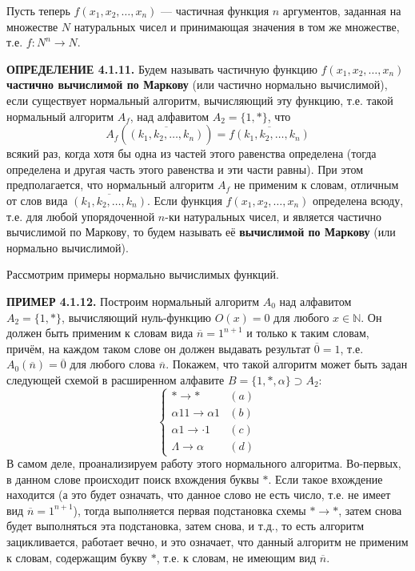 \documentclass[a4paper,12pt]{article}
\begin{document}
Пусть теперь \(f(x_1, x_2, \dots, x_n)\) --- частичная функция \(n\) аргументов, заданная на множестве \(N\) натуральных чисел и принимающая значения в том же множестве, т.е. \(f: N^n \to N\).

\textbf{ОПРЕДЕЛЕНИЕ 4.1.11.} Будем называть частичную функцию \(f(x_1, x_2, \dots, x_n)\) \textbf{частично вычислимой по Маркову} (или частично нормально вычислимой), если существует нормальный алгоритм, вычисляющий эту функцию, т.е. такой нормальный алгоритм \(A_f\), над алфавитом \(A_2 = \{1, *\}\), что
\[
A_f(\overline{(k_1, k_2, \dots, k_n)}) = \overline{f(k_1, k_2, \dots, k_n)}
\]
всякий раз, когда хотя бы одна из частей этого равенства определена (тогда определена и другая часть этого равенства и эти части равны). При этом предполагается, что нормальный алгоритм \(A_f\) не применим к словам, отличным от слов вида \(\overline{(k_1, k_2, \dots, k_n)}\). Если функция \(f(x_1, x_2, \dots, x_n)\) определена всюду, т.е. для любой упорядоченной \(n\)-ки натуральных чисел, и является частично вычислимой по Маркову, то будем называть её \textbf{вычислимой по Маркову} (или нормально вычислимой).

Рассмотрим примеры нормально вычислимых функций.

\textbf{ПРИМЕР 4.1.12.} Построим нормальный алгоритм \(A_0\) над алфавитом \(A_2 = \{1, *\}\), вычисляющий нуль-функцию \(O(x) = 0\) для любого \(x \in \mathbb{N}\). Он должен быть применим к словам вида \(\overline{n} = 1^{n+1}\) и только к таким словам, причём, на каждом таком слове он должен выдавать результат \(\overline{0} = 1\), т.е. \(A_0(\overline{n}) = \overline{0}\) для любого слова \(\overline{n}\). Покажем, что такой алгоритм может быть задан следующей схемой в расширенном алфавите \(B = \{1, *, \alpha\} \supset A_2\):
\[
\begin{cases}
* \to * & (a) \\
\alpha 11 \to \alpha 1 & (b) \\
\alpha 1 \to \cdot 1 & (c) \\
\Lambda \to \alpha & (d)
\end{cases}
\]
В самом деле, проанализируем работу этого нормального алгоритма. Во-первых, в данном слове происходит поиск вхождения буквы \(*\). Если такое вхождение находится (а это будет означать, что данное слово не есть число, т.е. не имеет вид \(\overline{n} = 1^{n+1}\)), тогда выполняется первая подстановка схемы \(* \to *\), затем снова будет выполняться эта подстановка, затем снова, и т.д., то есть алгоритм зацикливается, работает вечно, и это означает, что данный алгоритм не применим к словам, содержащим букву \(*\), т.е. к словам, не имеющим вид \(\overline{n}\).
\end{document}
